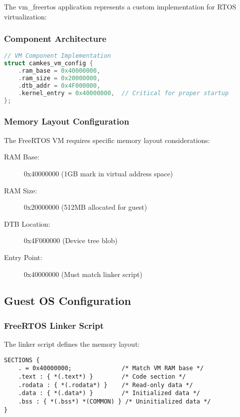 \documentclass[11pt,a4paper]{article}
\begin{document}
The vm\_freertos application represents a custom implementation for RTOS virtualization:

\subsubsection{Component Architecture}

\begin{lstlisting}[language=c, caption=FreeRTOS VM Main Structure]
// VM Component Implementation
struct camkes_vm_config {
    .ram_base = 0x40000000,
    .ram_size = 0x20000000,
    .dtb_addr = 0x4F000000,
    .kernel_entry = 0x40000000,  // Critical for proper startup
};
\end{lstlisting}

\subsubsection{Memory Layout Configuration}

The FreeRTOS VM requires specific memory layout considerations:

\begin{description}
\item[RAM Base:] 0x40000000 (1GB mark in virtual address space)
\item[RAM Size:] 0x20000000 (512MB allocated for guest)
\item[DTB Location:] 0x4F000000 (Device tree blob)
\item[Entry Point:] 0x40000000 (Must match linker script)
\end{description}

\subsection{Guest OS Configuration}

\subsubsection{FreeRTOS Linker Script}

The linker script defines the memory layout:

\begin{lstlisting}[caption=FreeRTOS Linker Script]
SECTIONS {
    . = 0x40000000;              /* Match VM RAM base */
    .text : { *(.text*) }        /* Code section */
    .rodata : { *(.rodata*) }    /* Read-only data */
    .data : { *(.data*) }        /* Initialized data */
    .bss : { *(.bss*) *(COMMON) } /* Uninitialized data */
}
\end{lstlisting}
\end{document}
